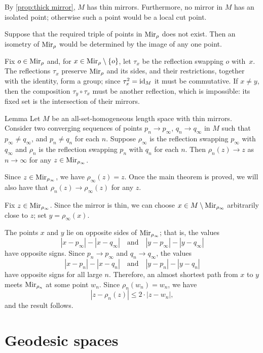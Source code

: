 \documentclass[a4paper,10pt]{article}
\begin{document}
By \ref{prop:thick mirror}, $M$ has thin mirrors.
Furthermore, no mirror in $M$ has an isolated point; otherwise such a point would be a local cut point.

Suppose that the required triple of points in $\mathrm{Mir}_\rho$ does not exist.
Then an isometry of $\mathrm{Mir}_\rho$ would be determined by the image of any one point.

Fix $o\in \mathrm{Mir}_\rho$ and, for $x\in \mathrm{Mir}_\rho\setminus\{o\}$, let $\tau_x$ be the reflection swapping $o$ with~$x$.
The reflections $\tau_x$ preserve $\mathrm{Mir}_\rho$ and its sides, and their restrictions, together with the identity, form a group;
since $\tau_x^2=\mathrm{id}_M$ it must be commutative.
If $x\ne y$, then the composition $\tau_y\circ\tau_x$ must be another reflection, which is impossible: its fixed set is the intersection of their mirrors.
\qeds

\begin{thm}{Lemma}\label{lem:cont-on-mirror}
Let $M$ be an all-set-homogeneous length space with thin mirrors.
Consider two converging sequences of points $p_n\to p_\infty$, $q_n\to q_\infty$ in $M$ such that $p_\infty\ne q_\infty$, and $p_n\ne q_n$ for each $n$.
Suppose $\rho_\infty$ is the reflection swapping $p_\infty$ with $q_\infty$ and $\rho_n$ is the reflection swapping $p_n$ with $q_n$ for each $n$.
Then $\rho_n(z)\to z$ as $n\to\infty$ for any $z\in \mathrm{Mir}_{\rho_\infty}$.
\end{thm}

Since $z\in \mathrm{Mir}_{\rho_\infty}$, we have $\rho_\infty(z)=z$.
Once the main theorem is proved, we will also have that $\rho_n(z)\to \rho_\infty(z)$ for any $z$.

Fix $z\in\mathrm{Mir}_{\rho_\infty}$.
Since the mirror is thin, we can choose $x\in M\setminus\mathrm{Mir}_{\rho_\infty}$ arbitrarily close to $z$;
set $y=\rho_\infty(x)$.




The points $x$ and $y$ lie on opposite sides of $\mathrm{Mir}_{\rho_\infty}$;
that is, the values
\[
|x-p_\infty|-|x-q_\infty|
\quad\text{and}\quad
|y-p_\infty|-|y-q_\infty|
\]
have opposite signs.
Since $p_n\to p_\infty$ and $q_n\to q_\infty$,
the values
\[
|x-p_n|-|x-q_n|
\quad\text{and}\quad
|y-p_n|-|y-q_n|
\]
have opposite signs for all large $n$.
Therefore, an almost shortest path from $x$ to $y$ meets $\mathrm{Mir}_{\rho_n}$ at some point $w_n$.
Since $\rho_n(w_n)=w_n$, we have
\[
|z-\rho_n(z)|
\leqslant 2\cdot|z-w_n|,
\]
and the result follows.
\qeds

\section{Geodesic spaces}\label{Locally unique geodesics}
\end{document}
